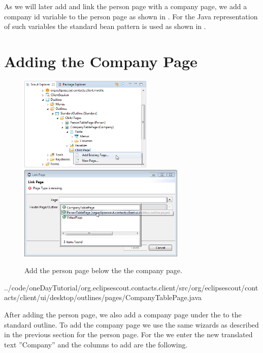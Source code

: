 \documentclass[a4paper,10pt,twoside]{book}
\begin{document}
As we will later add and link the person page with a company page, we add a company id variable to the person page as shown in . 
For the Java representation of such variables the standard bean pattern is used as shown in .

\section{Adding the Company Page}

\begin{figure}
\includegraphics[height=4.5cm]{add_existing_page_contextmenu.png} \hspace{5mm}
\includegraphics[height=4.5cm]{add_existing_page.png}
\caption{Add the person page below the the company page.}
\end{figure}


{../code/oneDayTutorial/org.eclipsescout.contacts.client/src/org/eclipsescout/contacts/client/ui/desktop/outlines/pages/CompanyTablePage.java}

After adding the person page, we also add a company page under the  to the standard outline. 
To add the company page we use the same wizards as described in the previous section for the person page. 
For the  we enter the new translated text ''Company'' and the columns to add are the following.
\end{document}
